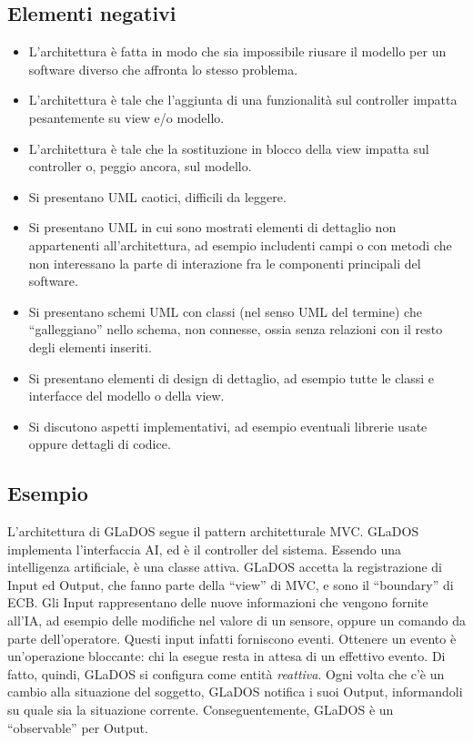 \documentclass[a4paper,12pt]{report}
\begin{document}
\subsection*{Elementi negativi}
\begin{itemize}
	\item L'architettura è fatta in modo che sia impossibile riusare il modello per un software diverso che affronta lo stesso problema.
	\item L'architettura è tale che l'aggiunta di una funzionalità sul controller impatta pesantemente su view e/o modello.
	\item L'architettura è tale che la sostituzione in blocco della view impatta sul controller o, peggio ancora, sul modello.
	\item Si presentano UML caotici, difficili da leggere.
	\item Si presentano UML in cui sono mostrati elementi di dettaglio non appartenenti all'architettura, ad esempio includenti campi o con metodi che non interessano la parte di interazione fra le componenti principali del software.
	\item Si presentano schemi UML con classi (nel senso UML del termine) che ``galleggiano'' nello schema, non connesse, ossia senza relazioni con il resto degli elementi inseriti.
	\item Si presentano elementi di design di dettaglio, ad esempio tutte le classi e interfacce del modello o della view.
	\item Si discutono aspetti implementativi, ad esempio eventuali librerie usate oppure dettagli di codice.
\end{itemize}

\subsection*{Esempio}

L'architettura di GLaDOS segue il pattern architetturale MVC.
%
GLaDOS implementa l'interfaccia AI, ed è il controller del sistema.
Essendo una intelligenza artificiale, è una classe attiva.
%
GLaDOS accetta la registrazione di Input ed Output, che fanno parte della ``view'' di MVC, e sono il ``boundary'' di ECB.
Gli Input rappresentano delle nuove informazioni che vengono fornite all'IA, ad esempio delle modifiche nel valore di un sensore, oppure un comando da parte dell'operatore.
Questi input infatti forniscono eventi.
Ottenere un evento è un'operazione bloccante: chi la esegue resta in attesa di un effettivo evento.
Di fatto, quindi, GLaDOS si configura come entità \textit{reattiva}.
Ogni volta che c'è un cambio alla situazione del soggetto, GLaDOS notifica i suoi Output,
informandoli su quale sia la situazione corrente.
%
Conseguentemente, GLaDOS è un ``observable'' per Output.
\end{document}

